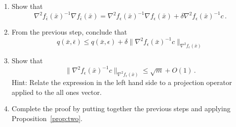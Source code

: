 \documentclass[12pt]{article}
\begin{document}
\begin{enumerate}
\item
Show that
\[
\nabla^2 f_{\bar\epsilon}(\bar x)^{-1}\nabla f_{\bar\epsilon}(\bar x)
= \nabla^2 f_{\epsilon}(\bar x)^{-1}\nabla f_{\epsilon}(\bar x)
+ \delta \nabla^2 f_\epsilon(\bar x)^{-1}c\,.
\]
\item
From the previous step, conclude that
\[
q(\bar x,\bar\epsilon)
\le q(\bar x,\epsilon) + 
\delta\|\nabla^2 f_\epsilon(\bar x)^{-1}c\|_{\nabla^2 f_\epsilon(\bar x)}
\]
\item
Show that
\[
\|\nabla^2 f_\epsilon(\bar x)^{-1}c\|_{\nabla^2 f_\epsilon(\bar x)}
\le \sqrt{m} + O(1)\,.
\]
Hint: Relate the expression in the left hand side to a projection operator
applied to the all ones vector.
\item
Complete the proof by putting together the previous steps and applying
Proposition~\ref{prop:two}.
\end{enumerate}
\end{document}
